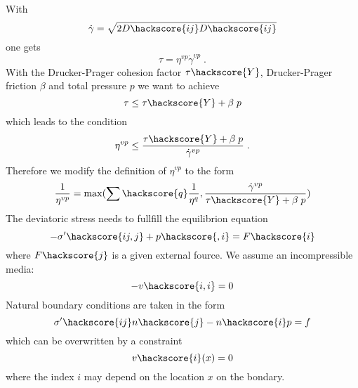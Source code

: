With
\begin{equation}\label{IKM-EQU-8}
\dot{\gamma}=\sqrt{2 D\hackscore{ij} D\hackscore{ij}}
\end{equation}
one gets 
\begin{equation}\label{IKM-EQU-8b}
\tau = \eta^{vp} \dot{\gamma}^{vp} \;.
\end{equation}
With the Drucker-Prager cohesion factor $\tau\hackscore{Y}$, Drucker-Prager friction $\beta$ and total pressure $p$ we want to achieve 
\begin{equation}\label{IKM-EQU-8c}
\tau \le \tau\hackscore{Y} + \beta \; p
\end{equation}
which leads to the condition
\begin{equation}\label{IKM-EQU-8d}
\eta^{vp} \le \frac{\tau\hackscore{Y} + \beta \; p}{ \dot{\gamma}^{vp}} \; .
\end{equation}
Therefore we modify the definition of $\eta^{vp}$ to the form
\begin{equation}\label{IKM-EQU-6b}
\frac{1}{\eta^{vp}}=\max(\sum\hackscore{q} \frac{1}{\eta^{q}}, \frac{\dot{\gamma}^{vp}} {\tau\hackscore{Y} + \beta \; p})
\end{equation}
The deviatoric stress needs to fullfill the equilibrion equation
\begin{equation}\label{IKM-EQU-1}
-\sigma'\hackscore{ij,j}+p\hackscore{,i}=F\hackscore{i}
\end{equation}
where $F\hackscore{j}$ is a given external fource. We assume an incompressible media:
\begin{equation}\label{IKM-EQU-2}
-v\hackscore{i,i}=0
\end{equation}
Natural boundary conditions are taken in the form 
\begin{equation}\label{IKM-EQU-Boundary}
\sigma'\hackscore{ij}n\hackscore{j}-n\hackscore{i}p=f
\end{equation}
which can be overwritten by a constraint 
\begin{equation}\label{IKM-EQU-Boundary0}
v\hackscore{i}(x)=0
\end{equation}
where the index $i$ may depend on the location $x$ on the bondary.


